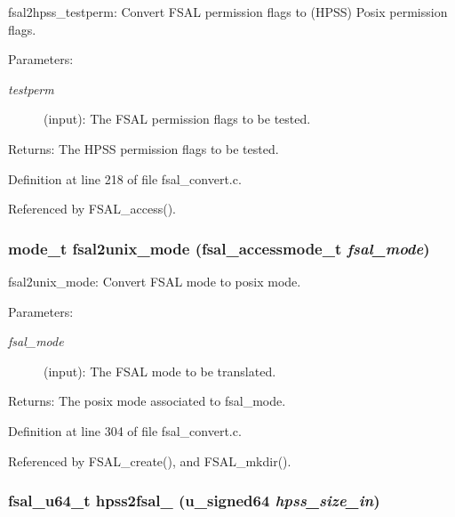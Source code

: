 fsal2hpss\_\-testperm: Convert FSAL permission flags to (HPSS) Posix permission flags.

\begin{Desc}
\item[Parameters:]
\begin{description}
\item[{\em testperm}](input): The FSAL permission flags to be tested.\end{description}
\end{Desc}
\begin{Desc}
\item[Returns:]The HPSS permission flags to be tested. \end{Desc}


Definition at line 218 of file fsal\_\-convert.c.

Referenced by FSAL\_\-access().
\subsubsection[{fsal2unix\_\-mode}]{\setlength{\rightskip}{0pt plus 5cm}mode\_\-t fsal2unix\_\-mode (fsal\_\-accessmode\_\-t {\em fsal\_\-mode})}\label{fsal__convert_8c_d39aceba2aa5bbef96f35a802e463222}


fsal2unix\_\-mode: Convert FSAL mode to posix mode.

\begin{Desc}
\item[Parameters:]
\begin{description}
\item[{\em fsal\_\-mode}](input): The FSAL mode to be translated.\end{description}
\end{Desc}
\begin{Desc}
\item[Returns:]The posix mode associated to fsal\_\-mode. \end{Desc}


Definition at line 304 of file fsal\_\-convert.c.

Referenced by FSAL\_\-create(), and FSAL\_\-mkdir().
\subsubsection[{hpss2fsal\_\-64}]{\setlength{\rightskip}{0pt plus 5cm}fsal\_\-u64\_\-t hpss2fsal\_ (u\_\-signed64 {\em hpss\_\-size\_\-in})}\label{fsal__convert_8c_1720b0c9b09fd3abc1b5384937d9c7f1}


